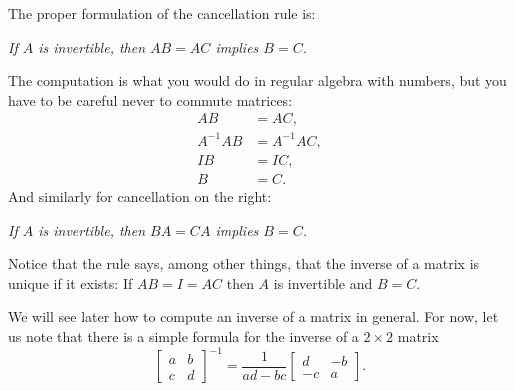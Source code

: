The proper formulation of the cancellation rule is:
\begin{center}
\emph{If $A$ is invertible,
then
$AB = AC$ implies $B=C$.}
\end{center}
The computation is what you would do in regular algebra with numbers,
but you have to
be careful never to commute matrices:
\begin{align*}
AB & = AC , \\
A^{-1}AB & = A^{-1}AC , \\
IB & = IC , \\
B & = C .
\end{align*}
And similarly for cancellation on the right:
\begin{center}
\emph{If $A$ is invertible,
then $BA = CA$ implies $B=C$.}
\end{center}

Notice that the rule says, among other things, that the
inverse of a matrix is unique if it exists:  If $AB = I = AC$ then $A$ is
invertible and $B=C$.

We will see later how to compute an inverse of a matrix
in general.  For now,
let us note that there is a simple formula for the inverse of
a $2 \times 2$ matrix
\begin{equation*}
\begin{bmatrix}
a & b \\
c & d
\end{bmatrix}^{-1}
=
\frac{1}{ad-bc}
\begin{bmatrix}
d & -b \\
-c & a
\end{bmatrix} .
\end{equation*}

